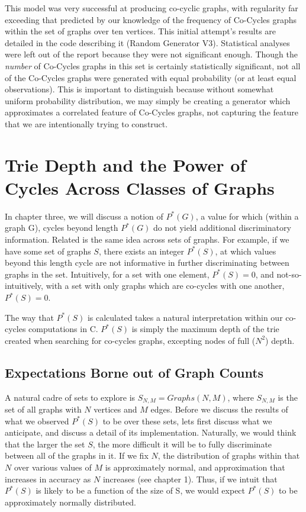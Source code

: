 This model was very successful at producing co-cyclic graphs, with regularity far exceeding that predicted by our knowledge of the frequency of Co-Cycles graphs within the set of graphs over ten vertices.
This initial attempt's results are detailed in the code describing it (Random Generator V3).
Statistical analyses were left out of the report because they were not significant enough.
Though the \emph{number} of Co-Cycles graphs in this set is certainly statistically significant, not all of the Co-Cycles graphs were generated with equal probability (or at least equal observations).
This is important to distinguish because without somewhat uniform probability distribution, we may simply be creating a generator which approximates a correlated feature of Co-Cycles graphs, not capturing the feature that we are intentionally trying to construct. 


\section{Trie Depth and the Power of Cycles Across Classes of Graphs}

In chapter three, we will discuss a notion of $P^*(G)$, a value for which (within a graph G), cycles beyond length $P^*(G)$ do not yield additional discriminatory information.
Related is the same idea across sets of graphs.
For example, if we have some set of graphs $S$, there exists an integer $P^*(S)$, at which values beyond this length cycle are not informative in further discriminating between graphs in the set.
Intuitively, for a set with one element, $P^*(S) = 0$, and not-so-intuitively, with a set with only graphs which are co-cycles with one another, $P^*(S) = 0$.

The way that  $P^*(S)$ is calculated takes a natural interpretation within our co-cycles computations in C. 
 $P^*(S)$ is simply the maximum depth of the trie created when searching for co-cycles graphs, excepting nodes of full ($N^2$) depth.

\subsection{Expectations Borne out of Graph Counts}

A natural cadre of sets to explore is $S_{N, M} = Graphs(N, M)$, where $S_{N, M}$ is the set of all graphs with $N$ vertices and $M$ edges.
Before we discuss the results of what we observed $P^*(S)$ to be over these sets, lets first discuss what we anticipate, and discuss a detail of its implementation.
Naturally, we would think that the larger the set $S$, the more difficult it will be to fully discriminate between all of the graphs in it.
If we fix $N$, the distribution of graphs within that $N$ over various values of $M$ is approximately normal, and approximation that increases in accuracy as $N$ increases (see chapter 1).
Thus, if we intuit that $P^*(S)$ is likely to be a function of the size of S, we would expect $P^*(S)$ to be approximately normally distributed.

